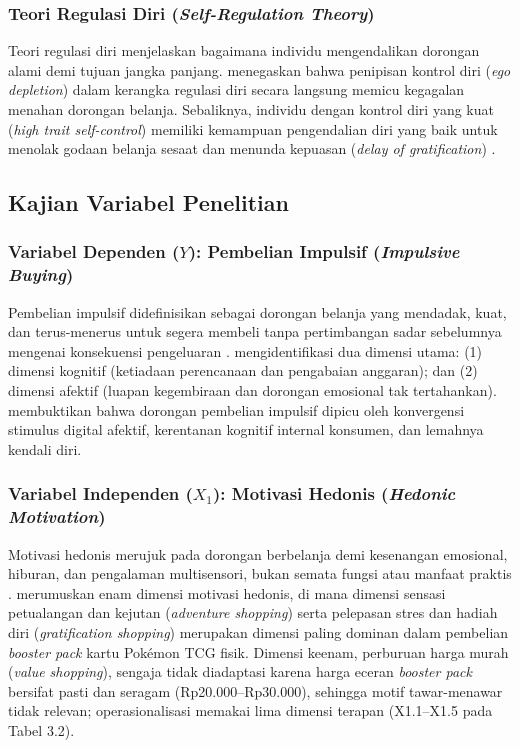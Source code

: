 \documentclass[12pt,a4paper]{article}
\numberwithin{equation}{section}
\numberwithin{table}{section}
\numberwithin{figure}{section}
\begin{document}
\subsubsection{Teori Regulasi Diri (\emph{Self-Regulation Theory})}

Teori regulasi diri \citep{baumeister2002yield} menjelaskan bagaimana individu mengendalikan dorongan alami demi tujuan jangka panjang. \citet{rafael2023intellectual} menegaskan bahwa penipisan kontrol diri (\emph{ego depletion}) dalam kerangka regulasi diri secara langsung memicu kegagalan menahan dorongan belanja. Sebaliknya, individu dengan kontrol diri yang kuat (\emph{high trait self-control}) memiliki kemampuan pengendalian diri yang baik untuk menolak godaan belanja sesaat dan menunda kepuasan (\emph{delay of gratification}) \citep{tangney2004high}.

\subsection{Kajian Variabel Penelitian}

\subsubsection{Variabel Dependen ($Y$): Pembelian Impulsif (\emph{Impulsive Buying})}

Pembelian impulsif didefinisikan sebagai dorongan belanja yang mendadak, kuat, dan terus-menerus untuk segera membeli tanpa pertimbangan sadar sebelumnya mengenai konsekuensi pengeluaran \citep{rook1987buying, lubis2022evaluation, nyrhinen2024online}. \citet{verplanken2001individual} mengidentifikasi dua dimensi utama: (1) dimensi kognitif (ketiadaan perencanaan dan pengabaian anggaran); dan (2) dimensi afektif (luapan kegembiraan dan dorongan emosional tak tertahankan). \citet{nyrhinen2024online} membuktikan bahwa dorongan pembelian impulsif dipicu oleh konvergensi stimulus digital afektif, kerentanan kognitif internal konsumen, dan lemahnya kendali diri.

\subsubsection{Variabel Independen ($X_1$): Motivasi Hedonis (\emph{Hedonic Motivation})}

Motivasi hedonis merujuk pada dorongan berbelanja demi kesenangan emosional, hiburan, dan pengalaman multisensori, bukan semata fungsi atau manfaat praktis \citep{babin1994work, widyastuti2024power}. \citet{arnold2003hedonic} merumuskan enam dimensi motivasi hedonis, di mana dimensi sensasi petualangan dan kejutan (\emph{adventure shopping}) serta pelepasan stres dan hadiah diri (\emph{gratification shopping}) merupakan dimensi paling dominan dalam pembelian \emph{booster pack} kartu Pok\'emon TCG fisik. Dimensi keenam, perburuan harga murah (\emph{value shopping}), sengaja tidak diadaptasi karena harga eceran \emph{booster pack} bersifat pasti dan seragam (Rp20.000--Rp30.000), sehingga motif tawar-menawar tidak relevan; operasionalisasi memakai lima dimensi terapan (X1.1--X1.5 pada Tabel 3.2).
\end{document}
